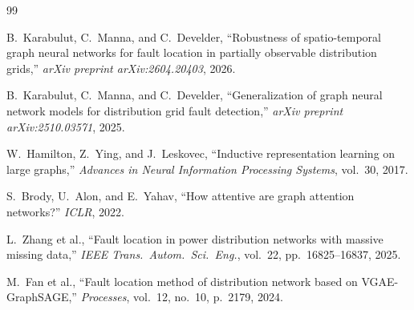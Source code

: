 \documentclass[11pt,a4paper]{article}
\begin{document}
\begin{thebibliography}{99}

B.~Karabulut, C.~Manna, and C.~Develder,
``Robustness of spatio-temporal graph neural networks for fault location in
partially observable distribution grids,''
\textit{arXiv preprint arXiv:2604.20403}, 2026.

B.~Karabulut, C.~Manna, and C.~Develder,
``Generalization of graph neural network models for distribution grid fault
detection,''
\textit{arXiv preprint arXiv:2510.03571}, 2025.

W.~Hamilton, Z.~Ying, and J.~Leskovec,
``Inductive representation learning on large graphs,''
\textit{Advances in Neural Information Processing Systems}, vol.~30, 2017.

S.~Brody, U.~Alon, and E.~Yahav,
``How attentive are graph attention networks?''
\textit{ICLR}, 2022.

L.~Zhang et al.,
``Fault location in power distribution networks with massive missing data,''
\textit{IEEE Trans.\ Autom.\ Sci.\ Eng.}, vol.~22, pp.~16825--16837, 2025.

M.~Fan et al.,
``Fault location method of distribution network based on VGAE-GraphSAGE,''
\textit{Processes}, vol.~12, no.~10, p.~2179, 2024.

\end{thebibliography}
\end{document}
